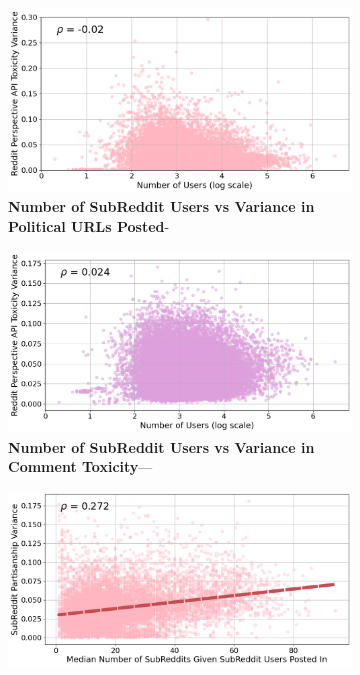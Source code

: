 \begin{figure}
\begin{subfigure}{.48\textwidth}
  \centering
  \includegraphics[width=1\linewidth]{figures/user-partisanship-var.png}
  \caption{\textbf{Number of SubReddit Users vs Variance in Political URLs Posted}-
}
\label{fig:participation-political}
\end{subfigure}%
\begin{subfigure}{.48\textwidth}
  \centering
  \includegraphics[width=1\linewidth]{figures/user-toxicity-var.png}
 \caption{\textbf{Number of SubReddit Users vs Variance in Comment Toxicity}— 
}
 \label{fig:participation-toxicity}
\end{subfigure}
\begin{subfigure}{.48\textwidth}
  \centering
  \includegraphics[width=1\linewidth]{figures/partisanship-to-num-subreddits.png}
 

\end{subfigure}
\end{figure}
